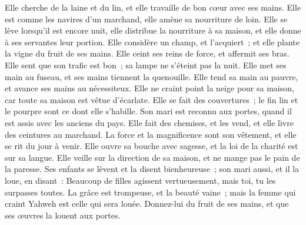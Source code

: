 \begin{multicols}{2}
 Elle cherche de la laine et du lin, et elle travaille de bon cœur avec ses mains.
 Elle est comme les navires d'un marchand, elle amène sa nourriture de loin.
 Elle se lève lorsqu'il est encore nuit, elle distribue la nourriture à sa maison, et elle donne à ses servantes leur portion.
 Elle considère un champ, et l'acquiert~; et elle plante la vigne du fruit de ses mains.
 Elle ceint ses reins de force, et affermit ses bras.
 Elle sent que son trafic est bon~; sa lampe ne s'éteint pas la nuit.
 Elle met ses main au fuseau, et ses mains tiennent la quenouille.
 Elle tend sa main au pauvre, et avance ses mains au nécessiteux.
 Elle ne craint point la neige pour sa maison, car toute sa maison est vêtue d'écarlate.
 Elle se fait des couvertures~; le fin lin et le pourpre sont ce dont elle s'habille.
 Son mari est reconnu aux portes, quand il est assis avec les anciens du pays.
 Elle fait des chemises, et les vend, et elle livre des ceintures au marchand.
 La force et la magnificence sont son vêtement, et elle se rit du jour à venir.
 Elle ouvre sa bouche avec sagesse, et la loi de la charité est sur sa langue.
 Elle veille sur la direction de sa maison, et ne mange pas le pain de la paresse.
 Ses enfants se lèvent et la disent bienheureuse~; son mari aussi, et il la loue, en disant~:
 Beaucoup de filles agissent vertueusement, mais toi, tu les surpasses toutes.
 La grâce est trompeuse, et la beauté vaine~; mais la femme qui craint Yahweh est celle qui sera louée.
 Donnez-lui du fruit de ses mains, et que ses œuvres la louent aux portes.
\PPE{}
\end{multicols}
